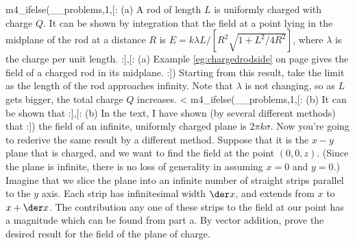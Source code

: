m4_ifelse(__problems,1,[:%
          (a) A rod of length $L$ is uniformly charged with charge $Q$.
          It can be shown by integration that the field at a point lying in the midplane of the rod
          at a distance $R$ is  $E =  k\lambda L/\left[R^2\sqrt{1+ L^2/4 R^2}\right]$, where $\lambda$
          is the charge per unit length.
        :],[:%
          (a) Example \ref{eg:chargedrodside} on page \pageref{eg:chargedrodside}
        gives the field of a charged rod in its midplane.
        :])%
        Starting from this result, take the limit as the length of the rod approaches infinity.
        Note that $\lambda$ is not changing, so as $L$ gets bigger, the total charge $Q$ increases.
        <%
        m4_ifelse(__problems,1,[:
          (b) It can be shown that
        :],[:%
          (b) In the text, I have shown (by several different methods) that
        :])%
        the field of an infinite,
        uniformly charged plane is $2\pi k\sigma$. Now you're going to
        rederive the same result by a different method.
        Suppose that it is the $x-y$ plane that is charged, and we
        want to find the field at the point $(0,0,z)$. (Since the plane
        is infinite, there is no loss of generality in assuming
        $x=0$ and $y=0$.)
        Imagine that we slice the plane into an infinite number of
        straight strips parallel to the $y$ axis.
        Each strip has infinitesimal width $\der x$, and extends
        from $x$ to $x+\der x$. The contribution any one of these
        strips to the field at our point has a magnitude which can
        be found from part a.
        By vector addition, prove the desired result for the field of
        the plane of charge. 
